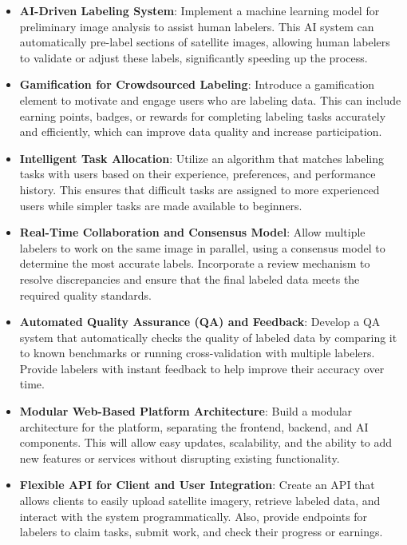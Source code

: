 \documentclass[12pt]{article}
\begin{document}
\begin{itemize} 
    \item \textbf{AI-Driven Labeling System}: Implement a machine learning model for preliminary image analysis to assist human labelers. This AI system can automatically pre-label sections of satellite images, allowing human labelers to validate or adjust these labels, significantly speeding up the process.
    
    \item \textbf{Gamification for Crowdsourced Labeling}: Introduce a gamification element to motivate and engage users who are labeling data. This can include earning points, badges, or rewards for completing labeling tasks accurately and efficiently, which can improve data quality and increase participation.
    
    \item \textbf{Intelligent Task Allocation}: Utilize an algorithm that matches labeling tasks with users based on their experience, preferences, and performance history. This ensures that difficult tasks are assigned to more experienced users while simpler tasks are made available to beginners.
    
    \item \textbf{Real-Time Collaboration and Consensus Model}: Allow multiple labelers to work on the same image in parallel, using a consensus model to determine the most accurate labels. Incorporate a review mechanism to resolve discrepancies and ensure that the final labeled data meets the required quality standards.
    
    \item \textbf{Automated Quality Assurance (QA) and Feedback}: Develop a QA system that automatically checks the quality of labeled data by comparing it to known benchmarks or running cross-validation with multiple labelers. Provide labelers with instant feedback to help improve their accuracy over time.
    
    \item \textbf{Modular Web-Based Platform Architecture}: Build a modular architecture for the platform, separating the frontend, backend, and AI components. This will allow easy updates, scalability, and the ability to add new features or services without disrupting existing functionality.
    
    \item \textbf{Flexible API for Client and User Integration}: Create an API that allows clients to easily upload satellite imagery, retrieve labeled data, and interact with the system programmatically. Also, provide endpoints for labelers to claim tasks, submit work, and check their progress or earnings.
    

\end{itemize}
\end{document}
